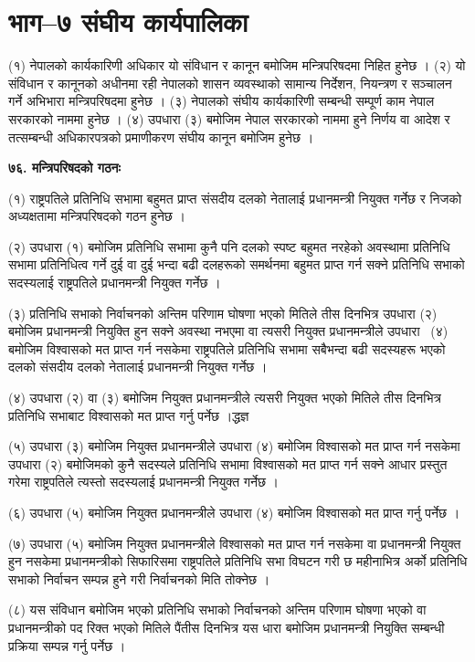 \section{भाग–७ संघीय कार्यपालिका}

(१) नेपालको कार्यकारिणी अधिकार यो संविधान र कानून बमोजिम मन्त्रिपरिषदमा निहित हुनेछ ।
(२) यो संविधान र कानूनको अधीनमा रही नेपालको शासन व्यवस्थाको सामान्य निर्देशन, नियन्त्रण र सञ्चालन गर्ने अभिभारा मन्त्रिपरिषदमा हुनेछ ।
(३) नेपालको संघीय कार्यकारिणी सम्बन्धी सम्पूर्ण काम नेपाल सरकारको नाममा हुनेछ ।
(४) उपधारा (३) बमोजिम नेपाल सरकारको नाममा हुने निर्णय वा आदेश र तत्सम्बन्धी अधिकारपत्रको प्रमाणीकरण संघीय कानून बमोजिम हुनेछ ।

\textbf{७६. मन्त्रिपरिषदको गठनः}

(१) राष्ट्रपतिले प्रतिनिधि सभामा बहुमत प्राप्त संसदीय दलको नेतालाई प्रधानमन्त्री नियुक्त गर्नेछ र निजको अध्यक्षतामा मन्त्रिपरिषदको गठन हुनेछ ।

(२) उपधारा (१) बमोजिम प्रतिनिधि सभामा कुनै पनि दलको स्पष्ट बहुमत नरहेको अवस्थामा प्रतिनिधि सभामा प्रतिनिधित्व गर्ने दुई वा दुई भन्दा बढी दलहरूको समर्थनमा बहुमत प्राप्त गर्न सक्ने प्रतिनिधि सभाको सदस्यलाई राष्ट्रपतिले प्रधानमन्त्री नियुक्त गर्नेछ ।

(३) प्रतिनिधि सभाको निर्वाचनको अन्तिम परिणाम घोषणा भएको मितिले तीस दिनभित्र उपधारा (२) बमोजिम प्रधानमन्त्री नियुक्ति हुन सक्ने अवस्था नभएमा वा त्यसरी नियुक्त प्रधानमन्त्रीले उपधारा  (४) बमोजिम विश्वासको मत प्राप्त गर्न नसकेमा राष्ट्रपतिले प्रतिनिधि सभामा सबैभन्दा बढी सदस्यहरू भएको दलको संसदीय दलको नेतालाई प्रधानमन्त्री नियुक्त गर्नेछ ।

(४) उपधारा (२) वा (३) बमोजिम नियुक्त प्रधानमन्त्रीले त्यसरी नियुक्त भएको मितिले तीस दिनभित्र प्रतिनिधि सभाबाट विश्वासको मत
प्राप्त गर्नु पर्नेछ ।द्धज्ञ

(५) उपधारा (३) बमोजिम नियुक्त प्रधानमन्त्रीले उपधारा (४) बमोजिम विश्वासको मत प्राप्त गर्न नसकेमा उपधारा (२) बमोजिमको कुनै सदस्यले प्रतिनिधि सभामा विश्वासको मत प्राप्त गर्न सक्ने आधार प्रस्तुत गरेमा राष्ट्रपतिले त्यस्तो सदस्यलाई प्रधानमन्त्री नियुक्त गर्नेछ ।

(६) उपधारा (५) बमोजिम नियुक्त प्रधानमन्त्रीले उपधारा (४) बमोजिम विश्वासको मत प्राप्त गर्नु पर्नेछ ।

(७) उपधारा (५) बमोजिम नियुक्त प्रधानमन्त्रीले विश्वासको मत प्राप्त गर्न नसकेमा वा प्रधानमन्त्री नियुक्त हुन नसकेमा प्रधानमन्त्रीको सिफारिसमा राष्ट्रपतिले प्रतिनिधि सभा विघटन गरी छ महीनाभित्र अर्को प्रतिनिधि सभाको निर्वाचन सम्पन्न हुने गरी निर्वाचनको मिति तोक्नेछ ।

(८) यस संविधान बमोजिम भएको प्रतिनिधि सभाको निर्वाचनको अन्तिम परिणाम घोषणा भएको वा प्रधानमन्त्रीको पद रिक्त भएको मितिले पैंतीस दिनभित्र यस धारा बमोजिम प्रधानमन्त्री नियुक्ति सम्बन्धी प्रक्रिया सम्पन्न गर्नु पर्नेछ ।

